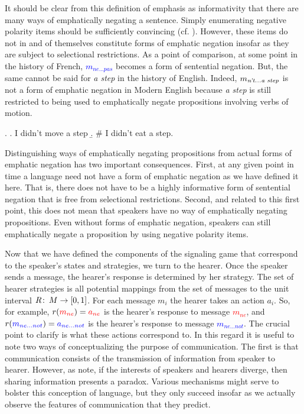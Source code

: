 \documentclass[linguex]{sp}
\theoremstyle{definition} \newtheorem{definition}{Definition}
\begin{document}
It should be clear from this definition of emphasis as informativity that there are many ways of emphatically negating a sentence. Simply enumerating negative polarity items should be sufficiently convincing (cf. \citealt{horn:1989}). However, these items do not in and of themselves constitute forms of emphatic negation insofar as they are subject to selectional restrictions. As a point of comparison, at some point in the history of French, \textcolor{blue}{$m_{ne...pas}$}  becomes a form of sentential negation. But, the same cannot be said for \emph{a step} in the history of English. Indeed, \textcolor{blue}{$m_{\text{\emph{n't...a step}}}$} is not a form of emphatic negation in Modern English because \emph{a step} is still restricted to being used to emphatically negate propositions involving verbs of motion.

\ex. \a. I didn't move a step
       \b. \# I didn't eat a step.

Distinguishing ways of emphatically negating propositions from actual forms of emphatic negation has two important consequences. First, at any given point in time a language need not have a form of emphatic negation as we have defined it here. That is, there does not have to be a highly informative form of sentential negation that is free from selectional restrictions. Second, and related to this first point, this does not mean that speakers have no way of emphatically negating propositions. Even without forms of emphatic negation, speakers can still emphatically negate a proposition by using negative polarity items.

Now that we have defined the components of the signaling game that correspond to the speaker's states and strategies, we turn to the hearer.  Once the speaker sends a message, the hearer's response is determined by her strategy. The set of hearer strategies is all potential mappings from the set of messages to the unit interval $R \colon\thinspace M \rightarrow [0,1]$. For each message $m_i$ the hearer takes an action $a_i$. So, for example, $r(\textcolor{red}{m_{ne}}) = \textcolor{red}{a_{ne}}$ is the hearer's response to message \emph{\textcolor{red}{$m_{ne}$}}, and  $r(\textcolor{blue}{m_{ne...not}}) = \textcolor{blue}{a_{ne...not}}$ is the hearer's response to message \emph{\textcolor{blue}{$m_{ne...not}$}}. The crucial point to clarify is what these actions correspond to. In this regard it is useful to note two ways of conceptualizing the purpose of communication. The first is that communication consists of the transmission of information from speaker to hearer. However, as  \cite{franke-etal:2012} note,  if the interests of speakers and hearers diverge, then sharing information presents a paradox. Various mechanisms might serve to bolster this conception of language, but they only succeed insofar as we actually observe the features of communication that they predict.
\end{document}
